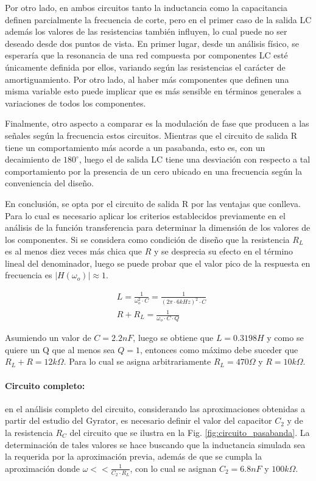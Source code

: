 Por otro lado, en ambos circuitos tanto la inductancia como la capacitancia definen parcialmente la frecuencia de corte, pero en el primer caso de la salida LC adem\'as los valores de las resistencias tambi\'en influyen,
lo cual puede no ser deseado desde dos puntos de vista. En primer lugar, desde un an\'alisis f\'isico, se esperar\'ia que la resonancia de una red compuesta por componentes LC est\'e \'unicamente definida por ellos, variando seg\'un las resistencias
el car\'acter de amortiguamiento. Por otro lado, al haber m\'as componentes que definen una misma variable esto puede implicar que es m\'as sensible en t\'erminos generales a variaciones de todos los componentes.

Finalmente, otro aspecto a comparar es la modulaci\'on de fase que producen a las se\~nales seg\'un la frecuencia estos circuitos. Mientras que el circuito de salida R tiene un comportamiento m\'as acorde a un pasabanda, esto es,
con un decaimiento de $180^{\circ}$, luego el de salida LC tiene una desviaci\'on con respecto a tal comportamiento por la presencia de un cero ubicado en una frecuencia seg\'un la conveniencia del dise\~no.

En conclusi\'on, se opta por el circuito de salida R por las ventajas que conlleva. Para lo cual es necesario aplicar los criterios establecidos previamente en el an\'alisis de la funci\'on transferencia
para determinar la dimensi\'on de los valores de los componentes. Si se considera como condici\'on de dise\~no que la resistencia $R_L$ es al menos diez veces m\'as chica que $R$ y se desprecia su efecto en el t\'ermino
lineal del denominador, luego se puede probar que el valor pico de la respuesta en frecuencia es $|H(\omega_o)| \approx 1$.

\begin{align*}
    & L = \frac{1}{\omega_o^{2} \cdot C} = \frac{1}{(2 \pi \cdot 6kHz )^{2} \cdot C} \\
    & R + R_L = \frac{1}{\omega_o \cdot C \cdot Q}
\end{align*}

Asumiendo un valor de $C = 2.2nF$, luego se obtiene que $L = 0.3198H$ y como se quiere un Q que al menos sea $Q = 1$, entonces como m\'aximo debe suceder que
$R_L + R = 12k\Omega$. Para lo cual se asigna arbitrariamente $R_L = 470 \Omega$ y $R = 10k\Omega$.

\paragraph*{Circuito completo:} en el an\'alisis completo del circuito, considerando las aproximaciones obtenidas a partir del estudio del Gyrator, es necesario definir el valor del capacitor
$C_2$ y de la resistencia $R_C$ del circuito que se ilustra en la Fig. \ref{fig:circuito_pasabanda}. La determinaci\'on de tales valores se hace buscando que la inductancia simulada sea la requerida por la aproximaci\'on previa,
adem\'as de que se cumpla la aproximaci\'on donde $\omega << \frac{1}{C_2 \cdot R_L}$, con lo cual se asignan $C_2 = 6.8nF$ y $100k\Omega$.

